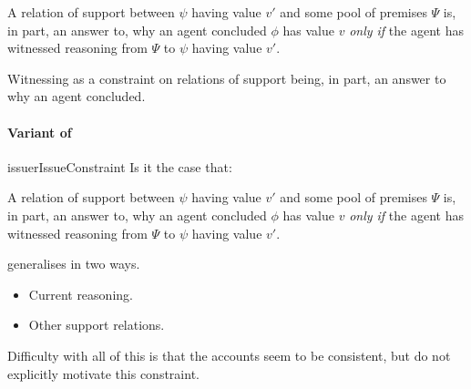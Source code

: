 \begin{note}
  \begin{idea}
    A relation of support between \(\psi\) having value \(v'\) and some pool of premises \(\Psi\) is, in part, an answer to, why an agent concluded \(\phi\) has value \(v\) \emph{only if} the agent has witnessed reasoning from \(\Psi\) to \(\psi\) having value \(v'\).
  \end{idea}
\end{note}

\begin{note}
  Witnessing as a constraint on relations of support being, in part, an answer to why an agent concluded.
\end{note}

\paragraph{Variant of \issueInclusion{}}
\label{sec:clar:expand:issue:variant}

\begin{note}
  \begin{restatable}[\issueConstraint{}]{issue}{rIssueConstraint}
    \label{issue:has-witnessed}
    Is it the case that:

    A relation of support between \(\psi\) having value \(v'\) and some pool of premises \(\Psi\) is, in part, an answer to, why an agent concluded \(\phi\) has value \(v\) \emph{only if} the agent has witnessed reasoning from \(\Psi\) to \(\psi\) having value \(v'\).
  \end{restatable}

  {
    \color{red}
    \issueConstraint{} generalises \issueInclusion{} in two ways.
    \begin{itemize}
    \item
      Current reasoning.
    \item
      Other support relations.
    \end{itemize}
  }

\end{note}

\begin{note}
  Difficulty with all of this is that the accounts seem to be consistent, but do not explicitly motivate this constraint.
\end{note}

